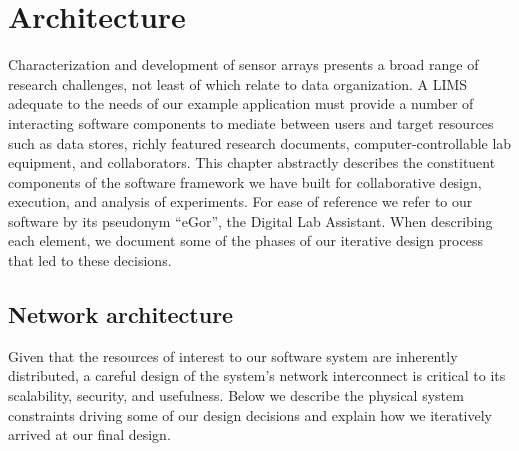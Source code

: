 \documentclass[../thesis]{subfiles}
\begin{document}
\chapter{Architecture}
Characterization and development of sensor arrays presents a broad
range of research challenges, not least of which relate to data
organization. A \gls{LIMS} adequate to the needs of our example
application must provide a number of interacting software components
to mediate between users and target resources such as data stores,
richly featured research documents, computer-controllable lab
equipment, and collaborators. This chapter abstractly describes the
constituent components of the software framework we have built for
collaborative design, execution, and analysis of experiments. For ease
of reference we refer to our software by its pseudonym ``eGor'', the
Digital Lab Assistant. When describing each element, we document some
of the phases of our iterative design process that led to these
decisions.

\section{Network architecture}
Given that the resources of interest to our software system are
inherently distributed, a careful design of the system's network
interconnect is critical to its scalability, security, and
usefulness. Below we describe the physical system constraints driving
some of our design decisions and explain how we iteratively arrived at
our final design.
\end{document}
